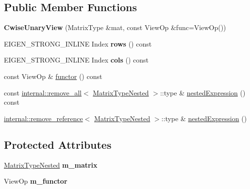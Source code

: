 \subsection*{Public Member Functions}
\begin{DoxyCompactItemize}
\item 
\mbox{\label{class_eigen_1_1_cwise_unary_view_a33c42081b0a0cd9f2d3ae8d53b2f2f14}} 
{\bfseries Cwise\+Unary\+View} (Matrix\+Type \&mat, const View\+Op \&func=View\+Op())
\item 
\mbox{\label{class_eigen_1_1_cwise_unary_view_a73f4f47d27550f52fb441312dc1f9b6d}} 
E\+I\+G\+E\+N\+\_\+\+S\+T\+R\+O\+N\+G\+\_\+\+I\+N\+L\+I\+NE Index {\bfseries rows} () const
\item 
\mbox{\label{class_eigen_1_1_cwise_unary_view_a2f67b90c44c20fa9cbaf48bc9bcc95d8}} 
E\+I\+G\+E\+N\+\_\+\+S\+T\+R\+O\+N\+G\+\_\+\+I\+N\+L\+I\+NE Index {\bfseries cols} () const
\item 
const View\+Op \& \mbox{\hyperlink{class_eigen_1_1_cwise_unary_view_af01271cdadcbcf195b5d3130ff2e1a48}{functor}} () const
\item 
const \mbox{\hyperlink{struct_eigen_1_1internal_1_1remove__all}{internal\+::remove\+\_\+all}}$<$ \mbox{\hyperlink{struct_eigen_1_1internal_1_1true__type}{Matrix\+Type\+Nested}} $>$\+::type \& \mbox{\hyperlink{class_eigen_1_1_cwise_unary_view_a21d59e387e600b1d650cb002175760b4}{nested\+Expression}} () const
\item 
\mbox{\hyperlink{struct_eigen_1_1internal_1_1remove__reference}{internal\+::remove\+\_\+reference}}$<$ \mbox{\hyperlink{struct_eigen_1_1internal_1_1true__type}{Matrix\+Type\+Nested}} $>$\+::type \& \mbox{\hyperlink{class_eigen_1_1_cwise_unary_view_add6689b53e595e968e89592ea30b6800}{nested\+Expression}} ()
\end{DoxyCompactItemize}
\subsection*{Protected Attributes}
\begin{DoxyCompactItemize}
\item 
\mbox{\label{class_eigen_1_1_cwise_unary_view_af3527b262bf7e654de105eec439cd51a}} 
\mbox{\hyperlink{struct_eigen_1_1internal_1_1true__type}{Matrix\+Type\+Nested}} {\bfseries m\+\_\+matrix}
\item 
\mbox{\label{class_eigen_1_1_cwise_unary_view_a75f8e8b7cdaeff50e664061bba0e7206}} 
View\+Op {\bfseries m\+\_\+functor}
\end{DoxyCompactItemize}


